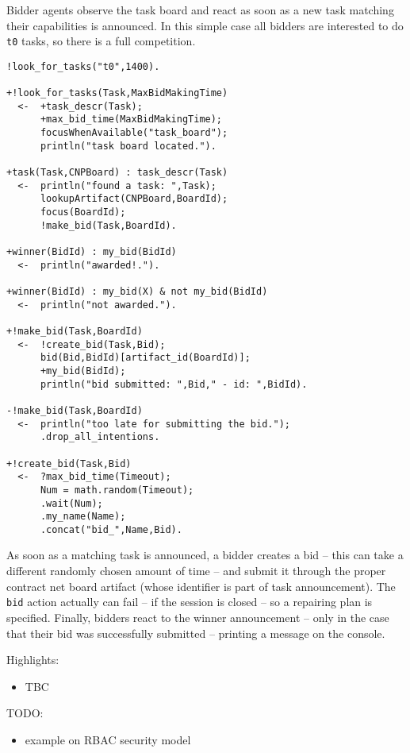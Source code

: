\documentclass[11pt]{report}
\newcommand\code[1]{{\small{\mbox{\texttt{{#1}}}}}}
\begin{document}
\medskip

Bidder agents observe the task board and react as soon as a new task matching their capabilities is announced.
%
In this simple case all bidders are interested to do \code{t0} tasks, so there is a full competition.
%

{\small{\begin{verbatim}
!look_for_tasks("t0",1400).

+!look_for_tasks(Task,MaxBidMakingTime) 
  <-  +task_descr(Task);
      +max_bid_time(MaxBidMakingTime);
      focusWhenAvailable("task_board");
      println("task board located.").
  
+task(Task,CNPBoard) : task_descr(Task)
  <-  println("found a task: ",Task);
      lookupArtifact(CNPBoard,BoardId);
      focus(BoardId);
      !make_bid(Task,BoardId).
    
+winner(BidId) : my_bid(BidId)
  <-  println("awarded!.").

+winner(BidId) : my_bid(X) & not my_bid(BidId)
  <-  println("not awarded.").
  
+!make_bid(Task,BoardId)
  <-  !create_bid(Task,Bid);
      bid(Bid,BidId)[artifact_id(BoardId)];
      +my_bid(BidId);
      println("bid submitted: ",Bid," - id: ",BidId).

-!make_bid(Task,BoardId)
  <-  println("too late for submitting the bid.");
      .drop_all_intentions.
  
+!create_bid(Task,Bid) 
  <-  ?max_bid_time(Timeout); 
      Num = math.random(Timeout);
      .wait(Num);
      .my_name(Name);
      .concat("bid_",Name,Bid).
 \end{verbatim}}}

\noindent As soon as a matching task is announced, a bidder creates a bid -- this can take a different randomly chosen amount of time -- and submit it through the proper contract net board artifact (whose identifier is part of task announcement).
%
The \code{bid} action actually can fail -- if the session is closed -- so a repairing plan is specified.
%
Finally, bidders react to the winner announcement -- only in the case that their bid was successfully submitted --  printing  a message on the console.

\medskip

\noindent Highlights:
%
\begin{itemize}
%
\item TBC
%
\end{itemize}


\newpage

\noindent TODO:
\begin{itemize}
\item example on RBAC security model
\end{itemize}



\end{document}
